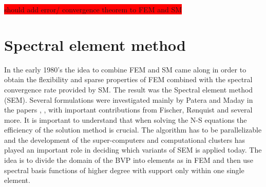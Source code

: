 \colorbox{red}{should add error/ convergence theorem to FEM and SM}


\section{Spectral element method} \label{sem}
In the early 1980's the idea to combine FEM and SM came along in order to obtain the 
flexibility and sparse properties of FEM 
combined with the spectral convergence rate provided by SM. 
The result was the Spectral element method (SEM). Several formulations were investigated mainly by 
Patera and Maday in the papers \cite{maday1989}, \cite{Patera1984}, \cite{Patera1986} with 
important contributions from Fischer, Rønquist and several more.
It is important to understand that when solving the N-S equations the efficiency of the solution 
method is crucial. The algorithm has to be parallelizable and the development of the
super-computers and computational clusters has played an important role in 
deciding which variants of SEM is applied today. 
The idea is to divide the domain of the BVP into elements as in FEM and then use spectral basis 
functions of higher degree with support only within one single element. 

